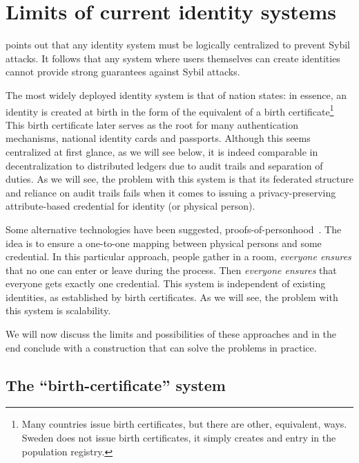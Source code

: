 \section{Limits of current identity systems}%
\label{identity-limits}

\Textcite{SybilAttack} points out that any identity system must be logically 
centralized to prevent Sybil attacks.
It follows that any system where users themselves can create identities cannot 
provide strong guarantees against Sybil attacks.

The most widely deployed identity system is that of nation states: in essence, 
an identity is created at birth in the form of the equivalent of a birth 
certificate\footnote{%
  Many countries issue birth certificates, but there are other, equivalent, 
  ways.
  \Eg Sweden does not issue birth certificates, it simply creates and entry in 
  the population registry.
} This birth certificate later serves as the root for many authentication 
mechanisms, \eg national identity cards and passports.
Although this seems centralized at first glance, as we will see below, it is 
indeed comparable in decentralization to distributed ledgers due to audit 
trails and separation of duties.
As we will see, the problem with this system is that its federated structure 
and reliance on audit trails fails when it comes to issuing a 
privacy-preserving attribute-based credential for identity (or physical 
person).

Some alternative technologies have been suggested, \eg 
proofs-of-personhood~\cite{proof-of-personhood}.
The idea is to ensure a one-to-one mapping between physical persons and some 
credential.
In this particular approach, people gather in a room, \emph{everyone ensures} 
that no one can enter or leave during the process.
Then \emph{everyone ensures} that everyone gets exactly one credential.
This system is independent of existing identities, \eg as established by birth 
certificates.
As we will see, the problem with this system is scalability.

We will now discuss the limits and possibilities of these approaches and in the 
end conclude with a construction that can solve the problems in practice.


\subsection{The \enquote{birth-certificate} system}

